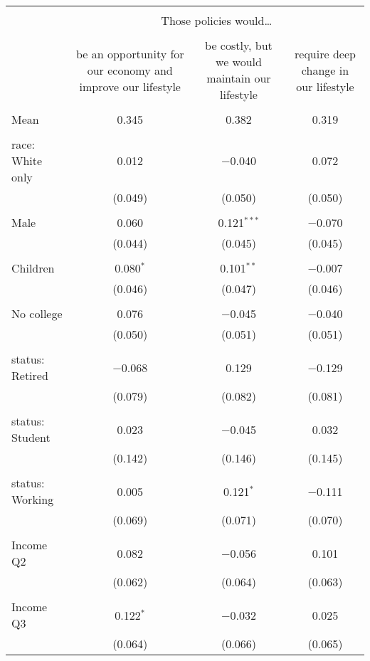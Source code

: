 
\begin{tabular}{@{\extracolsep{5pt}}lccc} 
\\[-1.8ex]\hline 
\hline \\[-1.8ex] 
 & \multicolumn{3}{c}{Those policies would…} \\ 
\cline{2-4} 
\\[-1.8ex] & be an opportunity for our economy and improve our lifestyle & be costly, but we would maintain our lifestyle & require deep change in our lifestyle \\ 
\hline \\[-1.8ex] 
 Mean & 0.345 & 0.382 & 0.319  \\ \hline \\[-1.8ex] race: White only & 0.012 & $-$0.040 & 0.072 \\ 
  & (0.049) & (0.050) & (0.050) \\ 
  & & & \\ 
 Male & 0.060 & 0.121$^{***}$ & $-$0.070 \\ 
  & (0.044) & (0.045) & (0.045) \\ 
  & & & \\ 
 Children & 0.080$^{*}$ & 0.101$^{**}$ & $-$0.007 \\ 
  & (0.046) & (0.047) & (0.046) \\ 
  & & & \\ 
 No college & 0.076 & $-$0.045 & $-$0.040 \\ 
  & (0.050) & (0.051) & (0.051) \\ 
  & & & \\ 
 status: Retired & $-$0.068 & 0.129 & $-$0.129 \\ 
  & (0.079) & (0.082) & (0.081) \\ 
  & & & \\ 
 status: Student & 0.023 & $-$0.045 & 0.032 \\ 
  & (0.142) & (0.146) & (0.145) \\ 
  & & & \\ 
 status: Working & 0.005 & 0.121$^{*}$ & $-$0.111 \\ 
  & (0.069) & (0.071) & (0.070) \\ 
  & & & \\ 
 Income Q2 & 0.082 & $-$0.056 & 0.101 \\ 
  & (0.062) & (0.064) & (0.063) \\ 
  & & & \\ 
 Income Q3 & 0.122$^{*}$ & $-$0.032 & 0.025 \\ 
  & (0.064) & (0.066) & (0.065) \\ 

\end{tabular}
